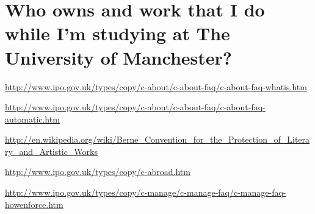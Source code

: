 \documentclass{article}
\begin{document}
\section{Who owns and work that I do while I'm studying at The University of Manchester?}

\begin{thebibliography}{9}

  \url{http://www.ipo.gov.uk/types/copy/c-about/c-about-faq/c-about-faq-whatis.htm}

  \url{http://www.ipo.gov.uk/types/copy/c-about/c-about-faq/c-about-faq-automatic.htm}

  \url{http://en.wikipedia.org/wiki/Berne_Convention_for_the_Protection_of_Literary_and_Artistic_Works}

  \url{http://www.ipo.gov.uk/types/copy/c-abroad.htm}

  \url{http://www.ipo.gov.uk/types/copy/c-manage/c-manage-faq/c-manage-faq-howenforce.htm}

\end{thebibliography}
\end{document}
